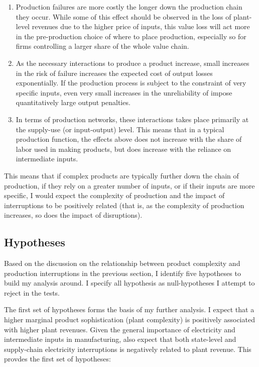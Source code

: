 \documentclass[11pt]{article}
\begin{document}
\begin{enumerate}

\item Production failures are more costly the longer down the production chain they occur. While some of this effect should be observed in the loss of plant-level revenues due to the higher price of inputs, this value loss will act more in the pre-production choice of where to place production, especially so for firms controlling a larger share of the whole value chain.

\item As the necessary interactions to produce a product increase, small increases in the risk of failure increases the expected cost of output losses exponentially. If the production process is subject to the constraint of very specific inputs, even very small increases in the unreliability of impose quantitatively large output penalties.

\item In terms of production networks, these interactions takes place primarily at the supply-use (or input-output) level. This means that in a typical production function, the effects above does not increase with the share of labor used in making products, but does increase with the reliance on intermediate inputs.

\end{enumerate}

This means that if complex products are typically further down the chain of production, if they rely on a greater number of inputs, or if their inputs are more specific, I would expect the complexity of production and the impact of interruptions to be positively related (that is, as the complexity of production increases, so does the impact of disruptions). 


\subsection{Hypotheses}
\label{sub:hyp}
Based on the discussion on the relationship between product complexity and production interruptions in the previous section, I identify five hypotheses to build my analysis around. I specify all hypothesis as null-hypotheses I attempt to reject in the tests. 

The first set of hypotheses forms the basis of my further analysis. I expect that a higher marginal product sophistication (plant complexity) is positively associated with higher plant revenues. Given the general importance of electricity and intermediate inputs in manufacturing, also expect that both state-level and supply-chain electricity interruptions is negatively related to plant revenue. This provdes the first set of hypotheses:
\end{document}
